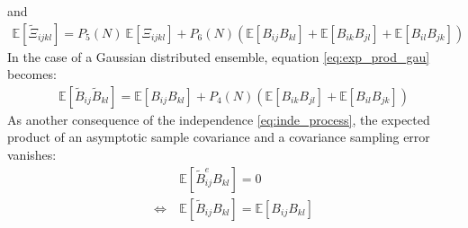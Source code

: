 \documentclass[12pt]{scrartcl}
\begin{document}
and
\begin{align}
\label{eq:exp_mom_4_exp}
\mathbb{E} \left[\widetilde{\Xi}_{ijkl}\right] = P_5(N) \ \mathbb{E} \left[\Xi_{ijkl}\right]+ P_6(N) \left(\mathbb{E} \left[B_{ij}B_{kl}\right] + \mathbb{E} \left[B_{ik}B_{jl}\right] + \mathbb{E} \left[B_{il}B_{jk}\right] \right) 
\end{align}
$  $\\
In the case of a Gaussian distributed ensemble, equation \eqref{eq:exp_prod_gau} becomes:
\begin{align}
\label{eq:exp_prod_gau_exp}
\mathbb{E} \left[\widetilde{B}_{ij} \widetilde{B}_{kl}\right] = \mathbb{E} \left[B_{ij} B_{kl}\right] + P_4(N) \left(\mathbb{E} \left[B_{ik} B_{jl}\right] + \mathbb{E} \left[B_{il} B_{jk}\right]\right)
\end{align}
$  $\\
As another consequence of the independence \eqref{eq:inde_process}, the expected product of an asymptotic sample covariance and a covariance sampling error vanishes:
\begin{align}
& \mathbb{E}\left[\widetilde{B}^e_{ij} B_{kl} \right] = 0 \\
\label{eq:truth_noise_inde}
\Leftrightarrow \ & \mathbb{E}\left[\widetilde{B}_{ij} B_{kl} \right] = \mathbb{E}\left[B_{ij} B_{kl} \right]
\end{align}
\end{document}

